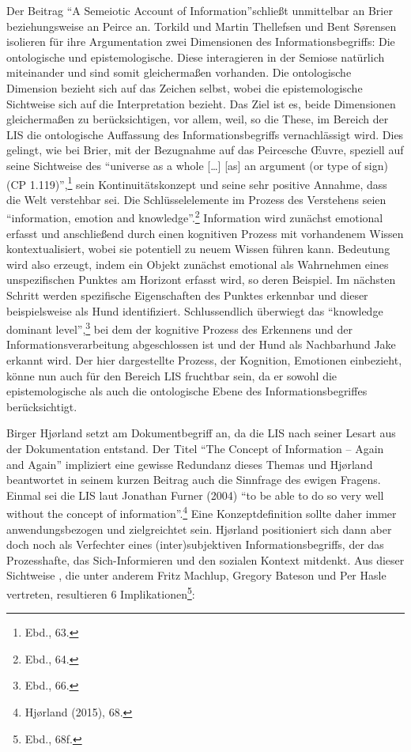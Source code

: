 \documentclass[a4paper,
fontsize=11pt,
oneside,
numbers=noperiodatend,
parskip=half-,
bibliography=totoc,
final
]{scrartcl}
\begin{document}
Der Beitrag \enquote{A Semeiotic Account of Information}schließt
unmittelbar an Brier beziehungsweise an Peirce an. Torkild und Martin
Thellefsen und Bent Sørensen isolieren für ihre Argumentation zwei
Dimensionen des Informationsbegriffs: Die ontologische und
epistemologische. Diese interagieren in der Semiose natürlich
miteinander und sind somit gleichermaßen vorhanden. Die ontologische
Dimension bezieht sich auf das Zeichen selbst, wobei die
epistemologische Sichtweise sich auf die Interpretation bezieht. Das
Ziel ist es, beide Dimensionen gleichermaßen zu berücksichtigen, vor
allem, weil, so die These, im Bereich der LIS die ontologische
Auffassung des Informationsbegriffs vernachlässigt wird. Dies gelingt,
wie bei Brier, mit der Bezugnahme auf das Peircesche Œuvre, speziell auf
seine Sichtweise des \enquote{universe as a whole {[}\ldots{}{]}
{[}as{]} an argument (or type of sign) (CP 1.119)},\footnote{Ebd., 63.}
sein Kontinuitätskonzept und seine sehr positive Annahme, dass die Welt
verstehbar sei. Die Schlüsselelemente im Prozess des Verstehens seien
\enquote{information, emotion and knowledge}.\footnote{Ebd., 64.}
Information wird zunächst emotional erfasst und anschließend durch einen
kognitiven Prozess mit vorhandenem Wissen kontextualisiert, wobei sie
potentiell zu neuem Wissen führen kann. Bedeutung wird also erzeugt,
indem ein Objekt zunächst emotional als Wahrnehmen eines unspezifischen
Punktes am Horizont erfasst wird, so deren Beispiel. Im nächsten Schritt
werden spezifische Eigenschaften des Punktes erkennbar und dieser
beispielsweise als Hund identifiziert. Schlussendlich überwiegt das
\enquote{knowledge dominant level},\footnote{Ebd., 66.} bei dem der
kognitive Prozess des Erkennens und der Informationsverarbeitung
abgeschlossen ist und der Hund als Nachbarhund Jake erkannt wird. Der
hier dargestellte Prozess, der Kognition, Emotionen einbezieht, könne
nun auch für den Bereich LIS fruchtbar sein, da er sowohl die
epistemologische als auch die ontologische Ebene des
Informationsbegriffes berücksichtigt.

Birger Hjørland setzt am Dokumentbegriff an, da die LIS nach seiner
Lesart aus der Dokumentation entstand. Der Titel \enquote{The Concept of
Information -- Again and Again} impliziert eine gewisse Redundanz dieses
Themas und Hjørland beantwortet in seinem kurzen Beitrag auch die
Sinnfrage des ewigen Fragens. Einmal sei die LIS laut Jonathan Furner
(2004) \enquote{to be able to do so very well without the concept of
information}.\footnote{Hjørland (2015), 68.} Eine Konzeptdefinition
sollte daher immer anwendungsbezogen und zielgreichtet sein. Hjørland
positioniert sich dann aber doch noch als Verfechter eines
(inter)subjektiven Informationsbegriffs, der das Prozesshafte, das
Sich-Informieren und den sozialen Kontext mitdenkt. Aus dieser
Sichtweise , die unter anderem Fritz Machlup, Gregory Bateson und Per
Hasle vertreten, resultieren 6 Implikationen\footnote{Ebd., 68f.}:
\end{document}
